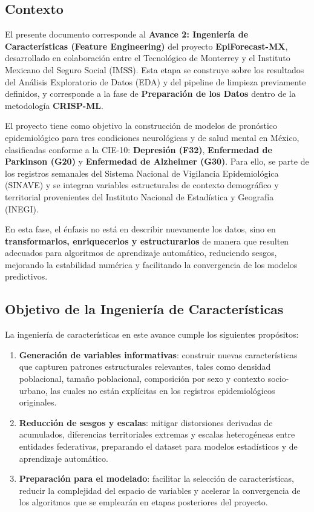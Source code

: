 \documentclass[12pt,letterpaper]{article}
\begin{document}
\subsection*{Contexto}

El presente documento corresponde al \textbf{Avance 2: Ingeniería de Características (Feature Engineering)} del proyecto \textbf{EpiForecast-MX}, desarrollado en colaboración entre el Tecnológico de Monterrey y el Instituto Mexicano del Seguro Social (IMSS). Esta etapa se construye sobre los resultados del Análisis Exploratorio de Datos (EDA) y del pipeline de limpieza previamente definidos, y corresponde a la fase de \textbf{Preparación de los Datos} dentro de la metodología \textbf{CRISP-ML}.

El proyecto tiene como objetivo la construcción de modelos de pronóstico epidemiológico para tres condiciones neurológicas y de salud mental en México, clasificadas conforme a la CIE-10: \textbf{Depresión (F32)}, \textbf{Enfermedad de Parkinson (G20)} y \textbf{Enfermedad de Alzheimer (G30)}. Para ello, se parte de los registros semanales del Sistema Nacional de Vigilancia Epidemiológica (SINAVE) y se integran variables estructurales de contexto demográfico y territorial provenientes del Instituto Nacional de Estadística y Geografía (INEGI).

En esta fase, el énfasis no está en describir nuevamente los datos, sino en \textbf{transformarlos, enriquecerlos y estructurarlos} de manera que resulten adecuados para algoritmos de aprendizaje automático, reduciendo sesgos, mejorando la estabilidad numérica y facilitando la convergencia de los modelos predictivos.

\subsection*{Objetivo de la Ingeniería de Características}

La ingeniería de características en este avance cumple los siguientes propósitos:

\begin{enumerate}
    \item \textbf{Generación de variables informativas}: construir nuevas características que capturen patrones estructurales relevantes, tales como densidad poblacional, tamaño poblacional, composición por sexo y contexto socio-urbano, las cuales no están explícitas en los registros epidemiológicos originales.
    \item \textbf{Reducción de sesgos y escalas}: mitigar distorsiones derivadas de acumulados, diferencias territoriales extremas y escalas heterogéneas entre entidades federativas, preparando el dataset para modelos estadísticos y de aprendizaje automático.
    \item \textbf{Preparación para el modelado}: facilitar la selección de características, reducir la complejidad del espacio de variables y acelerar la convergencia de los algoritmos que se emplearán en etapas posteriores del proyecto.
\end{enumerate}
\end{document}
